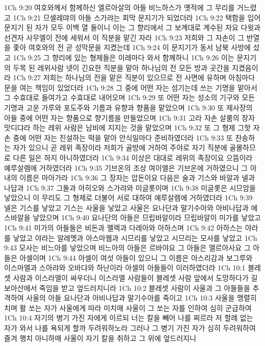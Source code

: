 1Ch 9:20  여호와께서 함께하신 엘르아살의 아들 비느하스가 옛적에 그 무리를 거느렸고
1Ch 9:21  므셀레먀의 아들 스가랴는 회막 문지기가 되었더라
1Ch 9:22  택함을 입어 문지기 된 자가 모두 이백 열 둘이니 이는 그 향리에서 그 보계대로 계수된 자요 다윗과 선견자 사무엘이 전에 세워서 이 직분을 맡긴 자라
1Ch 9:23  저희와 그 자손이 그 반열을 좇아 여호와의 전 곧 성막문을 지켰는데
1Ch 9:24  이 문지기가 동서 남북 사방에 섰고
1Ch 9:25  그 향리에 있는 형제들은 이레마다 와서 함께하니
1Ch 9:26  이는 문지기의 두목 된 레위사람 넷이 긴요한 직분을 맡아 하나님의 전 모든 방과 곳간을 지켰음이라
1Ch 9:27  저희는 하나님의 전을 맡은 직분이 있으므로 전 사면에 유하며 아침마다 문을 여는 책임이 있었더라
1Ch 9:28  그 중에 어떤 자는 섬기는데 쓰는 기명을 맡아서 그 수효대로 들여가고 수효대로 내어오며
1Ch 9:29  또 어떤 자는 성소의 기구와 모든 기명과 고운 가루와 포도주와 기름과 유향과 향품을 맡았으며
1Ch 9:30  또 제사장의 아들 중에 어떤 자는 향품으로 향기름을 만들었으며
1Ch 9:31  고라 자손 살룸의 장자 맛디댜라 하는 레위 사람은 남비에 지지는 것을 맡았으며
1Ch 9:32  또 그 형제 그핫 자손 중에 어떤 자는 진설하는 떡을 맡아 안식일마다 준비하였더라
1Ch 9:33  또 찬송하는 자가 있으니 곧 레위 족장이라 저희가 골방에 거하여 주야로 자기 직분에 골몰하므로 다른 일은 하지 아니하였더라
1Ch 9:34  이상은 대대로 레위의 족장이요 으뜸이라 예루살렘에 거하였더라
1Ch 9:35  기브온의 조상 여이엘은 기브온에 거하였으니 그 아내의 이름은 마아가라
1Ch 9:36  그 장자는 압돈이요 다음은 술과 기스와 바알과 넬과 나답과
1Ch 9:37  그돌과 아히오와 스가랴와 미글롯이며
1Ch 9:38  미글롯은 시므암을 낳았으니 이 무리도 그 형제로 더불어 서로 대하여 예루살렘에 거하였더라
1Ch 9:39  넬은 기스를 낳았고 기스는 사울을 낳았고 사울은 요나단과 말기수아와 아비나답과 에스바알을 낳았으며
1Ch 9:40  요나단의 아들은 므립바알이라 므립바알이 미가를 낳았고
1Ch 9:41  미가의 아들들은 비돈과 멜렉과 다레아와 아하스며
1Ch 9:42  아하스는 야라를 낳았고 야라는 알레멧과 아스마웹과 시므리를 낳았고 시므리는 모사를 낳았고
1Ch 9:43  모사는 비느아를 낳았으며 비느아의 아들은 르바야요 그 아들은 엘르아사요 그 아들은 아셀이며
1Ch 9:44  아셀이 여섯 아들이 있으니 그 이름은 아스리감과 보그루와 이스마엘과 스아랴와 오바댜와 하난이라 아셀의 아들들이 이러하였더라
1Ch 10:1  블레셋 사람과 이스라엘이 싸우더니 이스라엘 사람들이 블레셋 사람 앞에서 도망하다가 길보아산에서 죽임을 받고 엎드러지니라
1Ch 10:2  블레셋 사람이 사울과 그 아들들을 추격하여 사울의 아들 요나단과 아비나답과 말기수아를 죽이고
1Ch 10:3  사울을 맹렬히 치며 활 쏘는 자가 사울에게 따라 미치매 사울이 그 쏘는 자를 인하여 심히 군급하여
1Ch 10:4  자기의 병기 가진 자에게 이르되 너는 칼을 빼어 나를 찌르라 저 할례 없는 자가 와서 나를 욕되게 할까 두려워하노라 그러나 그 병기 가진 자가 심히 두려워하여 즐겨 행치 아니하매 사울이 자기 칼을 취하고 그 위에 엎드러지니
